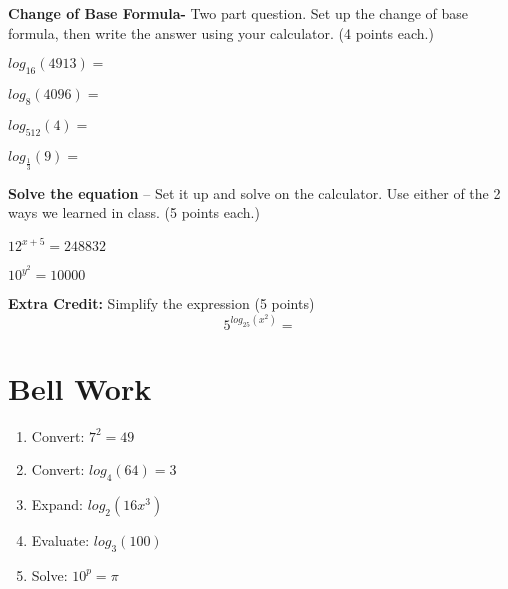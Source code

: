 \documentclass[12pt]{article}
\begin{document}
\textbf{Change of Base Formula-} Two part question. Set up the change of base formula, then write the answer using your calculator. (4 points each.)\\

\begin{enumerate}[resume]
\begin{multicols}{2}
	\setlength\itemsep{2cm}
	
	\item $log_{16}(4913)=$\\
	
	\item $log_{8}(4096)=$\\
	
	\item $log_{512}(4)=$\\
	
	\item $log_{\frac{1}{3}}(9)=$\\


\end{multicols}
\end{enumerate}

\textbf{Solve the equation} -- Set it up and solve on the calculator. Use either of the 2 ways we learned in class. (5 points each.)\\

\begin{enumerate}[resume]
\begin{multicols}{2}
	\setlength\itemsep{2cm}
	

	\item $12^{x+5}=248832$\\
	
	\item $10^{y^2}=10000$\\
	


\end{multicols}
\end{enumerate}

\vspace{1in}


\hrulefill

\textbf{Extra Credit:} Simplify the expression (5 points) $$5^{log_{25}(x^2)}=$$

\section{Bell Work}


\begin{enumerate}
	\item Convert: $7^2=49$\\
	
	\item Convert: $log_{4}(64)=3$\\
	
	\item Expand: $log_{2}(16x^3)$\\
	
	\item Evaluate: $log_{3}(100)$\\
	
	\item Solve: $10^p= \pi$
\end{enumerate}
\end{document}
